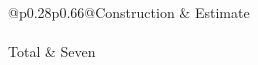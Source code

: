 \begin{tabular}{@{}p{0.28\linewidth}p{0.66\linewidth}@{}}Construction & Estimate \\  \\ Total & Seven \\ \end{tabular}
